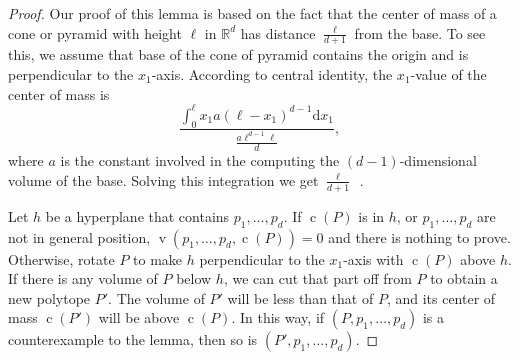 \documentclass[preprint, 12pt]{elsarticle}
\DeclareMathOperator{\vol}{v}
\DeclareMathOperator{\cog}{c}
\newcommand{\ud}{\mathrm{d}}
\begin{document}
\begin{proof}

  Our proof of this lemma is based on the fact that the center of mass of a cone or pyramid with height $\ell$ in $\mathbb{R}^{d}$ has distance $\frac{\ell}{d+1}$ from the base. To see this, we assume that base of the cone of pyramid contains the origin and is perpendicular to the $x_{1}$-axis. According to central identity, the $x_1$-value of the center of mass is
\[
\frac{\int_{0}^{\ell} x_1 a (\ell - x_1)^{d-1} \ud x_1 }{\frac{a \ell^{d-1} \ell}{d}},
\]
where $a$ is the constant involved in the computing the $(d-1)$-dimensional volume of the base. Solving this integration we get $\frac{\ell}{d+1}$~\cite{edwards98}.

Let $h$ be a hyperplane that contains $p_1,\ldots,p_d$.  If $\cog(P)$ is
in $h$, or $p_1,\ldots,p_d$ are not in general position, $\vol(p_1,\ldots,p_d,\cog(P)) = 0$ and there is nothing to
prove. Otherwise, rotate $P$ to make $h$ perpendicular to the $x_{1}$-axis
with $\cog(P)$ above $h$. If there is any volume of $P$ below $h$, we can
cut that part off from $P$ to obtain a new polytope $P'$.  The volume
of $P'$ will be less than that of $P$, and its center of mass $\cog(P')$ will
be above $\cog(P)$.  In this way, if $(P,p_1,\ldots,p_d)$ is a counterexample
to the lemma, then so is $(P',p_1,\ldots,p_d)$. 


\end{proof}
\end{document}
